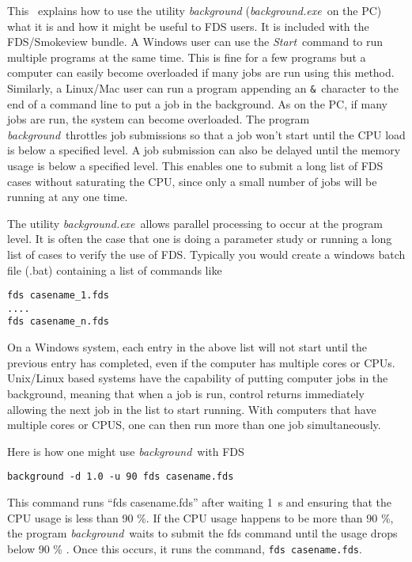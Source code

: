 
This \textchap\ explains how to use the utility {\em background} ({\em background.exe}\ on the PC) what it is and
how it might be useful to FDS users.  It is included with the FDS/Smokeview
bundle.  A Windows user can use the {\em Start}\ command to run multiple programs at the same time.  
This is fine for a few programs but a computer can easily become
overloaded if many jobs are run using this method.  
Similarly, a Linux/Mac user can run a program appending an {\tt \&}\ character to the end of a 
command line to put a job in the background.  As on the PC, if many jobs are run, the system can become overloaded.  
The program {\em background}\ throttles job submissions so that a job won't start until the CPU load is below a
specified level.  A job submission can also be delayed until the memory usage is below a specified level.  
This enables one to submit a long list of FDS cases without saturating the CPU,
since only a small number  of jobs will be
running at any one time.

The utility {\em background.exe}\ allows parallel
processing to occur at the program level.  It is often the case that one is doing a
parameter study or running a long list of cases to verify the use of FDS. Typically you
would create a windows batch file (.bat) containing a list of commands like

\begin{lstlisting}
fds casename_1.fds
....
fds casename_n.fds
\end{lstlisting}

On a Windows system, each entry in the above list will not start until the previous entry
has completed, even if the computer has multiple cores or CPUs.
Unix/Linux based systems have the capability of putting computer jobs in the background,
meaning that when a job is run, control returns immediately allowing the next job in the
list to start running.  With computers that have multiple cores or CPUS, one can then run
more than one job simultaneously.

Here is how one might use {\em background}\ with FDS

\begin{lstlisting}
background -d 1.0 -u 90 fds casename.fds
\end{lstlisting}

This command runs ``fds casename.fds'' after waiting 1~s and ensuring that the CPU usage is
less than 90 \%. If the CPU usage happens to be more than 90 \%, the program {\em background}\
waits to submit the fds command until the usage drops below 90 \% .  Once this occurs, it runs
the command, {\tt fds casename.fds}.


